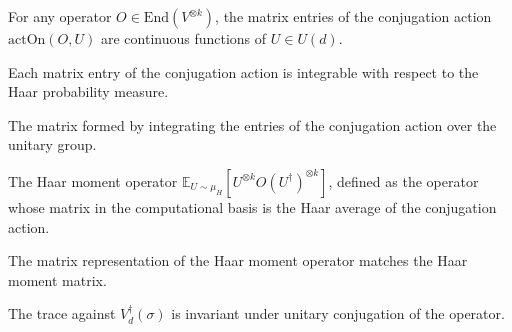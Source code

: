 \begin{theorem}\label{thm:continuous_actOn_entry}
  \leanok
  For any operator $O \in \text{End}(V^{\otimes k})$, the matrix entries of the conjugation action $\text{actOn}(O, U)$ are continuous functions of $U \in U(d)$.
\end{theorem}

\begin{theorem}\label{thm:integrable_actOn_entry}
  \leanok
  Each matrix entry of the conjugation action is integrable with respect to the Haar probability measure.
\end{theorem}

\begin{definition}\label{def:momentMatrix}
  \leanok
  The matrix formed by integrating the entries of the conjugation action over the unitary group.
\end{definition}

\begin{definition}\label{def:momentOp}
  \leanok
  The Haar moment operator $\mathbb{E}_{U \sim \mu_H}[U^{\otimes k} O (U^\dagger)^{\otimes k}]$, defined as the operator whose matrix in the computational basis is the Haar average of the conjugation action.
\end{definition}

\begin{theorem}\label{thm:toEndMatrix_momentOp}
  \leanok
  The matrix representation of the Haar moment operator matches the Haar moment matrix.
\end{theorem}

\begin{theorem}\label{thm:trace_permDual_actOn}
  \leanok
  The trace against $V_d^\dagger(\sigma)$ is invariant under unitary conjugation of the operator.
\end{theorem}

